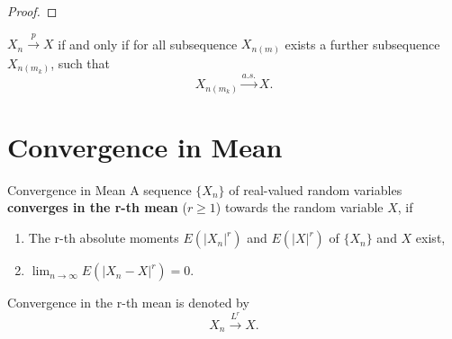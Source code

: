 \begin{proof}
    
\end{proof}

\begin{theorem}{}{}
    $X_n\stackrel{p}{\rightarrow}X$ if and only if for all subsequence $X_{n(m)}$ exists a further subsequence $X_{n(m_k)}$, such that
    \begin{equation}
        X_{n(m_k)}\stackrel{a.s.}{\rightarrow}X.
    \end{equation}
\end{theorem}


\section{Convergence in Mean}

\begin{definition}{Convergence in Mean}{}
    A sequence $\{X_n\}$ of real-valued random variables \textbf{converges in the r-th mean} ($r\geq1$) towards the random variable $X$, if
    \begin{enumerate}
        \item The r-th absolute moments $E(|X_n|^r)$ and $E(|X|^r)$ of $\{X_n\}$ and $X$ exist,
        \item $\lim_{n\to\infty}E\left(|X_n-X|^r\right)=0$.
    \end{enumerate}
    Convergence in the r-th mean is denoted by
    \begin{equation}
        X_n \stackrel{L^r}{\rightarrow} X.
    \end{equation}
\end{definition}
